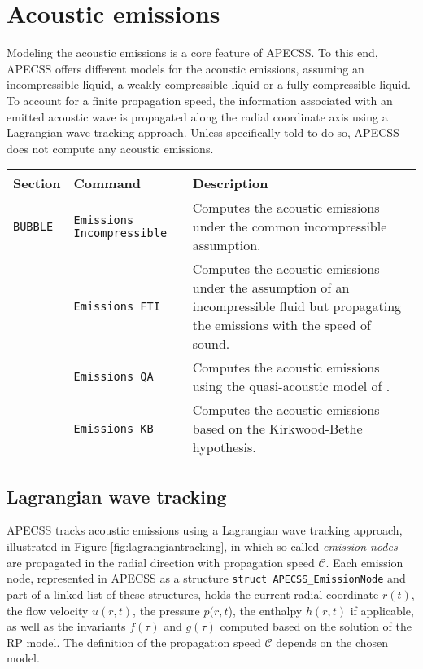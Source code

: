\chapter{Acoustic emissions}

Modeling the acoustic emissions is a core feature of APECSS. To this end, APECSS offers different models for the acoustic emissions, assuming an incompressible liquid, a weakly-compressible liquid or a fully-compressible liquid. To account for a finite propagation speed, the information associated with an emitted acoustic wave is propagated along the radial coordinate axis using a Lagrangian wave tracking approach. Unless specifically told to do so, APECSS does not compute any acoustic emissions. 

\vspace{0.8em}

\noindent
\begin{tabular}{p{} p{} p{}}
    \textbf{Section} &\textbf{Command} & \textbf{Description} 
\vspace{1mm} \\ \hline
{\tt BUBBLE} & {\tt Emissions Incompressible} & Computes the acoustic emissions under the common incompressible assumption.\\ 
& {\tt Emissions FTI} & Computes the acoustic emissions under the assumption of an incompressible fluid but propagating the emissions with the speed of sound.\\ 
& {\tt Emissions QA} & Computes the acoustic emissions using the quasi-acoustic model of \citet{Gilmore1952}.\\ 
& {\tt Emissions KB} & Computes the acoustic emissions based on the Kirkwood-Bethe hypothesis.\\ 
 \hline
\end{tabular} \vspace{1em}

\section{Lagrangian wave tracking}

APECSS tracks acoustic emissions using a Lagrangian wave tracking approach, illustrated in Figure \ref{fig:lagrangiantracking}, in which so-called \textit{emission nodes} are propagated in the radial direction with propagation speed $\mathcal{C}$. Each emission node, represented in APECSS as a structure {\tt struct APECSS\_EmissionNode} and part of a linked list of these structures, holds the current radial coordinate $r(t)$, the flow velocity $u(r,t)$, the pressure $p(r,t$), the enthalpy $h(r,t)$ if applicable, as well as the invariants $f(\tau)$ and $g(\tau)$ computed based on the solution of the RP model. The definition of the propagation speed $\mathcal{C}$ depends on the chosen model.

